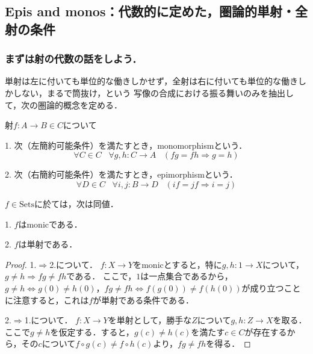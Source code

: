 \documentclass[uplatex, 12pt, dvipdfmx]{jsarticle}
\begin{document}
\subsection{Epis and monos：代数的に定めた，圏論的単射・全射の条件}

\subsubsection{まずは射の代数の話をしよう．}

単射は左に付いても単位的な働きしかせず，全射は右に付いても単位的な働きしかしない，まるで筒抜け，という
写像の合成における振る舞いのみを抽出して，次の圏論的概念を定める．
\begin{definition}[圏論的単射・全射]射$f:A\to B\in C$について

    1. 次（左簡約可能条件）を満たすとき，monomorphismという．
    \[ \forall C\in C\;\;\; \forall g,h:C\to A\;\;\; (fg=fh\Rightarrow g=h) \]
    \begin{center}
    \end{center}

    2. 次（右簡約可能条件）を満たすとき，epimorphismという．
    \[ \forall D\in C\;\;\; \forall i,j:B\to D\;\;\; (if=jf\Rightarrow i=j) \]
    \begin{center}
    \end{center}
\end{definition}

\begin{proposition}[Setsでは全射も全写も同値である]
    $f\in \mathrm{Sets}$に於ては，次は同値．

    1. $f$はmonicである．

    2. $f$は単射である．
\end{proposition}
\begin{proof}
    1.$\Rightarrow$2.について．
    $f:X\to Y$をmonicとすると，特に$g,h:1\to X$について，$g\ne h\Rightarrow fg\ne fh$である．
    ここで，$1$は一点集合であるから，$g\ne h\Leftrightarrow g(0)\ne h(0)$，$fg\ne fh\Leftrightarrow f(g(0))\ne f(h(0))$が成り立つことに注意すると，これは$f$が単射である条件である．

    2.$\Rightarrow$1.について．
    $f:X\to Y$を単射として，勝手な$Z$について$g,h:Z\to X$を取る．ここで$g\ne h$を仮定する．すると，$g(c)\ne h(c)$を満たす$c\in C$が存在するから，その$c$について$f\circ g(c)\ne f\circ h(c)$より，$fg\ne fh$を得る．
\end{proof}
\end{document}
